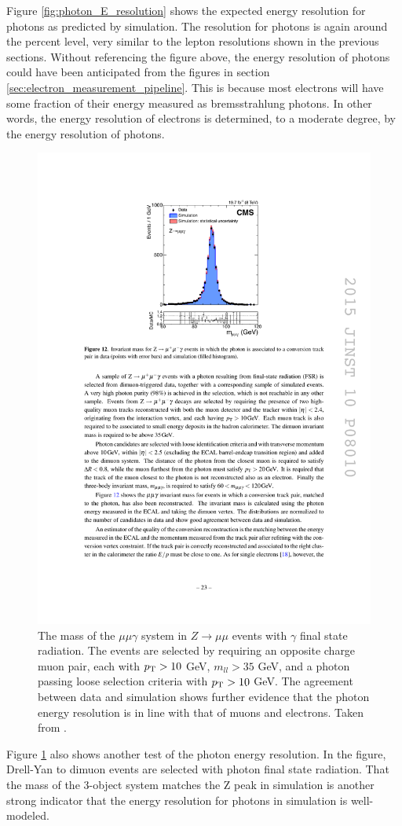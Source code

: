     Figure \ref{fig:photon_E_resolution} shows the expected energy resolution for photons as predicted by simulation. The resolution for photons is again around the percent level, very similar to the lepton resolutions shown in the previous sections. Without referencing the figure above, the energy resolution of photons could have been anticipated from the figures in section \ref{sec:electron_measurement_pipeline}. This is because most electrons will have some fraction of their energy measured as bremsstrahlung photons. In other words, the energy resolution of electrons is determined, to a moderate degree, by the energy resolution of photons.

    \begin{figure}[!h]
      \centering
      \includegraphics[width=.5\textwidth]{figures/photon_mumu_Z_peak.pdf}
      \caption[The mass of the $\mu \mu \gamma$ system in $Z \to \mu \mu$ events with $\gamma$ final state radiation.]{The mass of the $\mu \mu \gamma$ system in $Z \to \mu \mu$ events with $\gamma$ final state radiation. The events are selected by requiring an opposite charge muon pair, each with $p_{\mathrm{T}} > 10$ GeV, $m_{ll} > 35$ GeV, and a photon passing loose selection criteria with $p_{\mathrm{T}} > 10$ GeV. The agreement between data and simulation shows further evidence that the photon energy resolution is in line with that of muons and electrons. Taken from \cite[sec. 5]{cms_photons}.}
      \label{fig:photon_mumu_Z_peak}
    \end{figure}

    Figure \ref{fig:photon_mumu_Z_peak} also shows another test of the photon energy resolution. In the figure, Drell-Yan to dimuon events are selected with photon final state radiation. That the mass of the 3-object system matches the Z peak in simulation is another strong indicator that the energy resolution for photons in simulation is well-modeled.

